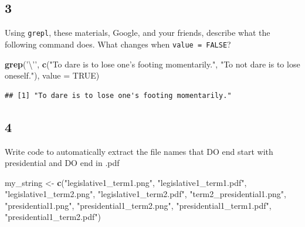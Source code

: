 \documentclass[]{book}
\newenvironment{Shaded}{\begin{snugshade}}{\end{snugshade}}
\newcommand{\CharTok}[1]{\textcolor[rgb]{0.31,0.60,0.02}{#1}}
\newcommand{\DataTypeTok}[1]{\textcolor[rgb]{0.13,0.29,0.53}{#1}}
\newcommand{\KeywordTok}[1]{\textcolor[rgb]{0.13,0.29,0.53}{\textbf{#1}}}
\newcommand{\NormalTok}[1]{#1}
\newcommand{\OtherTok}[1]{\textcolor[rgb]{0.56,0.35,0.01}{#1}}
\newcommand{\StringTok}[1]{\textcolor[rgb]{0.31,0.60,0.02}{#1}}
\theoremstyle{definition}
\theoremstyle{definition}
\theoremstyle{definition}
\theoremstyle{remark}
\begin{document}
\hypertarget{section-19}{%
\subsection*{3}\label{section-19}}

Using \texttt{grepl}, these materials, Google, and your friends, describe what the following command does. What changes when \texttt{value\ =\ FALSE}?

\begin{Shaded}
\begin{Highlighting}[]
\KeywordTok{grep}\NormalTok{(}\StringTok{'}\CharTok{\textbackslash{}'}\StringTok{'}\NormalTok{, }
     \KeywordTok{c}\NormalTok{(}\StringTok{"To dare is to lose one's footing momentarily."}\NormalTok{,  }\StringTok{"To not dare is to lose oneself."}\NormalTok{), }\DataTypeTok{value =} \OtherTok{TRUE}\NormalTok{)}
\end{Highlighting}
\end{Shaded}

\begin{verbatim}
## [1] "To dare is to lose one's footing momentarily."
\end{verbatim}

\hypertarget{section-20}{%
\subsection*{4}\label{section-20}}

Write code to automatically extract the file names that DO end start with presidential and DO end in .pdf

\begin{Shaded}
\begin{Highlighting}[]
\NormalTok{my_string <-}\StringTok{ }\KeywordTok{c}\NormalTok{(}\StringTok{"legislative1_term1.png"}\NormalTok{, }
               \StringTok{"legislative1_term1.pdf"}\NormalTok{,}
               \StringTok{"legislative1_term2.png"}\NormalTok{, }
               \StringTok{"legislative1_term2.pdf"}\NormalTok{,}
               \StringTok{"term2_presidential1.png"}\NormalTok{, }
               \StringTok{"presidential1.png"}\NormalTok{, }
               \StringTok{"presidential1_term2.png"}\NormalTok{,}
               \StringTok{"presidential1_term1.pdf"}\NormalTok{,}
               \StringTok{"presidential1_term2.pdf"}\NormalTok{)}
\end{Highlighting}
\end{Shaded}
\end{document}
